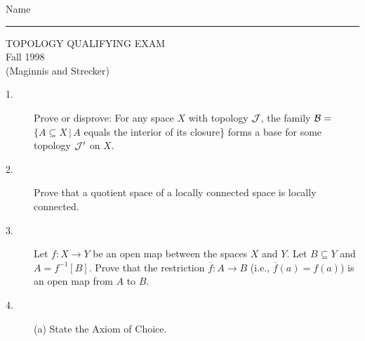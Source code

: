 \documentclass[bbb]{report}
\begin{document}

\begin{Large}

\hfill Name \rule{2.5in}{.01in}
\par
\vspace{.1in}

\begin{center}
   TOPOLOGY QUALIFYING EXAM \\
   Fall 1998 \\
   (Maginnis and Strecker) \\
\end{center}

\end{Large}

\vspace{.1in}

\begin{large}

\vspace{.2in}

\begin{description}

\item[1.]
Prove or disprove:
For any space $X$ with topology ${\cal J}$,
the family 
${\cal B}=$
\linebreak $\{ A\subseteq X\,\bigg|\,A$ equals the interior of its
closure\} forms a base for some topology ${\cal J}'$ on $X$.

\vspace{.5in}

\item[2.]
Prove that a quotient space of a locally connected space is
locally connected.

\vspace{.5in}

\item[3.]
Let $f:X\to Y$ be an open map between the spaces $X$ and $Y$.
Let $B\subseteq Y$ and $A=f^{-1}[B]$.
Prove that the restriction $\overline{f}:A\to B$
(i.e., $\overline{f}(a)=f(a)$) is an open map
from $A$ to $B$.

\vspace{.5in}

\item[4.]
(a) State the Axiom of Choice.


\end{description}
\end{large}
\end{document}

